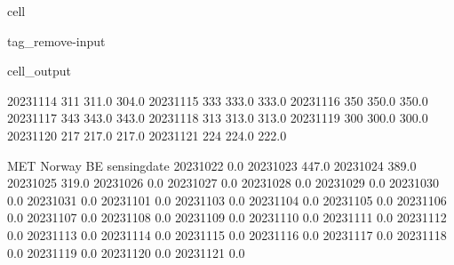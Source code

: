 \documentclass[letterpaper,10pt,english]{jupyterBook}
\begin{document}
\begin{sphinxuseclass}{cell}
\begin{sphinxuseclass}{tag_remove-input}
\begin{sphinxVerbatimOutput}
\begin{sphinxuseclass}{cell_output}
\begin{sphinxVerbatim}[commandchars=\\\{\}]
2023\PYGZhy{}11\PYGZhy{}14              311                  311.0                  304.0   
2023\PYGZhy{}11\PYGZhy{}15              333                  333.0                  333.0   
2023\PYGZhy{}11\PYGZhy{}16              350                  350.0                  350.0   
2023\PYGZhy{}11\PYGZhy{}17              343                  343.0                  343.0   
2023\PYGZhy{}11\PYGZhy{}18              313                  313.0                  313.0   
2023\PYGZhy{}11\PYGZhy{}19              300                  300.0                  300.0   
2023\PYGZhy{}11\PYGZhy{}20              217                  217.0                  217.0   
2023\PYGZhy{}11\PYGZhy{}21              224                  224.0                  222.0   

              MET Norway BE  
sensing\PYGZus{}date                 
2023\PYGZhy{}10\PYGZhy{}22              0.0  
2023\PYGZhy{}10\PYGZhy{}23            447.0  
2023\PYGZhy{}10\PYGZhy{}24            389.0  
2023\PYGZhy{}10\PYGZhy{}25            319.0  
2023\PYGZhy{}10\PYGZhy{}26              0.0  
2023\PYGZhy{}10\PYGZhy{}27              0.0  
2023\PYGZhy{}10\PYGZhy{}28              0.0  
2023\PYGZhy{}10\PYGZhy{}29              0.0  
2023\PYGZhy{}10\PYGZhy{}30              0.0  
2023\PYGZhy{}10\PYGZhy{}31              0.0  
2023\PYGZhy{}11\PYGZhy{}01              0.0  
2023\PYGZhy{}11\PYGZhy{}03              0.0  
2023\PYGZhy{}11\PYGZhy{}04              0.0  
2023\PYGZhy{}11\PYGZhy{}05              0.0  
2023\PYGZhy{}11\PYGZhy{}06              0.0  
2023\PYGZhy{}11\PYGZhy{}07              0.0  
2023\PYGZhy{}11\PYGZhy{}08              0.0  
2023\PYGZhy{}11\PYGZhy{}09              0.0  
2023\PYGZhy{}11\PYGZhy{}10              0.0  
2023\PYGZhy{}11\PYGZhy{}11              0.0  
2023\PYGZhy{}11\PYGZhy{}12              0.0  
2023\PYGZhy{}11\PYGZhy{}13              0.0  
2023\PYGZhy{}11\PYGZhy{}14              0.0  
2023\PYGZhy{}11\PYGZhy{}15              0.0  
2023\PYGZhy{}11\PYGZhy{}16              0.0  
2023\PYGZhy{}11\PYGZhy{}17              0.0  
2023\PYGZhy{}11\PYGZhy{}18              0.0  
2023\PYGZhy{}11\PYGZhy{}19              0.0  
2023\PYGZhy{}11\PYGZhy{}20              0.0  
2023\PYGZhy{}11\PYGZhy{}21              0.0  
\end{sphinxVerbatim}

\end{sphinxuseclass}\end{sphinxVerbatimOutput}

\end{sphinxuseclass}
\end{sphinxuseclass}
\end{document}
